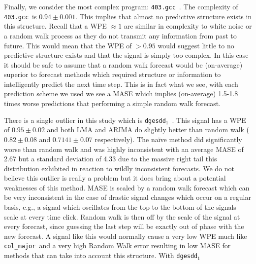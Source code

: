 \documentclass{article}
\newcommand{\gcc}{{\tt 403.gcc}~}
\newcommand{\svd}{{\tt dgesdd}~}
\newcommand{\svdone}{{\tt dgesdd}$_1$~}
\newcommand{\col}{{\tt col\_major}~}
\begin{document}
Finally, we consider the most complex program: \gcc. The complexity of \gcc is $0.94 \pm 0.001$. This implies that almost no predictive structure exists in this structure. Recall that a WPE $\approx 1$ are similar in complexity to white noise or a random walk process as they do not transmit any information from past to future. This would mean that the WPE of $>0.95$ would suggest little to no predictive structure exists and that the signal is simply too complex. In this case it should be safe to assume that a random walk forecast would be (on-average) superior to forecast methods which required structure or information to intelligently predict the next time step. This is in fact what we see, with each prediction scheme we used we see a MASE which implies (on-average) 1.5-1.8 times worse predictions that performing a simple random walk forecast. 

There is a single outlier in this study which is \svdone. This signal has a WPE of $0.95 \pm 0.02$ and both LMA and ARIMA do slightly better than random walk ($0.82 \pm 0.08$ and $0.7141 \pm 0.07$ respectively). The na\"ive method did significantly worse than random walk and was highly inconsistent with an average MASE of 2.67 but a standard deviation of 4.33 due to the massive right tail this distribution exhibited in reaction to wildly inconsistent forecasts. We do not believe this outlier is really a problem but it does bring about a potential weaknesses of this method. MASE is scaled by a random walk forecast which can be very inconsistent in the case of drastic signal changes which occur on a regular basis, e.g., a signal which oscillates from the top to the bottom of the signals scale at every time click. Random walk is then off by the scale of the signal at every forecast, since guessing the last step will be exactly out of phase with the new forecast. A signal like this would normally cause a very low WPE much like \col and a very high Random Walk error resulting in low MASE for methods that can take into account this structure. With \svdone


 



\end{document}
